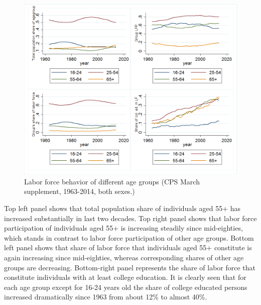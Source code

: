 \documentclass[
10pt, %
a4paper, %
oneside, %
headinclude,footinclude, %
BCOR5mm, %
]{scrartcl}
\begin{document}
\begin{figure}[h]
\centering 
\includegraphics[width=1.0\columnwidth]{old_on_work.png} 
\caption{Labor force behavior of different age groups (CPS March supplement, 1963-2014, both sexes.)} %
\label{fig:oldonwork_all} 
\end{figure}
Top left panel shows that total population share of individuals aged 55+ has increased substantially in last two decades. Top right panel shows that labor force participation of individuals aged 55+ is increasing steadily since mid-eighties, which stands in contrast to labor force participation of other age groups. Bottom left panel shows that share of labor force that individuals aged 55+ constitute is again increasing since mid-eighties, whereas corresponding shares of other age groups are decreasing. Bottom-right panel represents the share of labor force that constitute individuals with at least college education. It is clearly seen that for each age group except for 16-24 years old the share of college educated persons increased dramatically since 1963 from about 12\% to almost 40\%.
\end{document}

